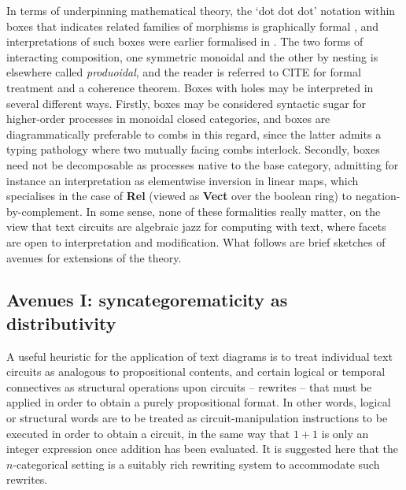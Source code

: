 In terms of underpinning mathematical theory, the `dot dot dot' notation within boxes that indicates related families of morphisms is graphically formal \citep{wilson_string_2022}, and interpretations of such boxes were earlier formalised in \citep{merry_reasoning_2014,quick_-logic_2015,zamdzhiev_rewriting_2017}. The two forms of interacting composition, one symmetric monoidal and the other by nesting is elsewhere called \emph{produoidal}, and the reader is referred to \bR CITE \e for formal treatment and a coherence theorem. Boxes with holes may be interpreted in several different ways. Firstly, boxes may be considered syntactic sugar for higher-order processes in monoidal closed categories, and boxes are diagrammatically preferable to combs in this regard, since the latter admits a typing pathology where two mutually facing combs interlock. Secondly, boxes need not be decomposable as processes native to the base category, admitting for instance an interpretation as elementwise inversion in linear maps, which specialises in the case of \textbf{Rel} (viewed as \textbf{Vect} over the boolean ring) to negation-by-complement. In some sense, none of these formalities really matter, on the view that text circuits are algebraic jazz for computing with text, where facets are open to interpretation and modification. What follows are brief sketches of avenues for extensions of the theory.

\subsection{Avenues I: syncategorematicity as distributivity}

A useful heuristic for the application of text diagrams is to treat individual text circuits as analogous to propositional contents, and certain logical or temporal connectives as structural operations upon circuits -- rewrites -- that must be applied in order to obtain a purely propositional format. In other words, logical or structural words are to be treated as circuit-manipulation instructions to be executed in order to obtain a circuit, in the same way that $1 + 1$ is only an integer expression once addition has been evaluated. It is suggested here that the $n$-categorical setting is a suitably rich rewriting system to accommodate such rewrites.


